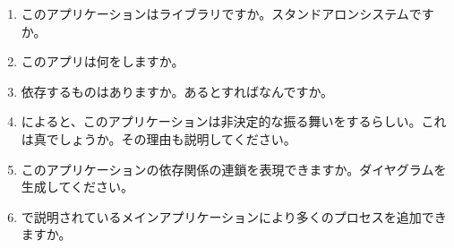 \begin{enumerate}
  \item このアプリケーションはライブラリですか。スタンドアロンシステムですか。
  \item このアプリは何をしますか。
  \item 依存するものはありますか。あるとすればなんですか。
  \item {}によると、このアプリケーションは非決定的な振る舞いをするらしい。これは真でしょうか。その理由も説明してください。
  \item このアプリケーションの依存関係の連鎖を表現できますか。ダイヤグラムを生成してください。
  \item {}で説明されているメインアプリケーションにより多くのプロセスを追加できますか。
\end{enumerate}

